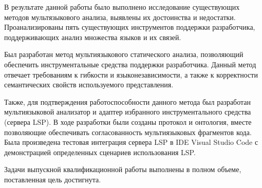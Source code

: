 \Conclusion %

В результате данной работы было выполнено исследование существующих методов мультязыкового анализа,
выявлены их достоинства и недостатки. Проанализированы пять существующих инструментов поддержки разработчика,
поддерживающих анализ множества языков и их связей.

Был разработан метод мультиязыкового статического анализа, позволяющий
обеспечить инструментальные средства поддержки разработчика. Данный метод отвечает требованиям
к гибкости и языконезависимости, а также к корректности семантических свойств используемого представления.

Также, для подтверждения работоспособности данного метода был разработан мультиязыковой анализатор
и адаптер избранного инструментального средства (сервера LSP). В ходе разработки были созданы
протокол и онтология, вместе позволяющие обеспечивать согласованность мультиязыковых фрагментов
кода. Была произведена тестовая интеграция сервера LSP в IDE Visual Studio Code с демонстрацией определенных
сценариев использования LSP.

Задачи выпускной квалификационной работы выполнены в полном объеме, поставленная цель достигнута.


